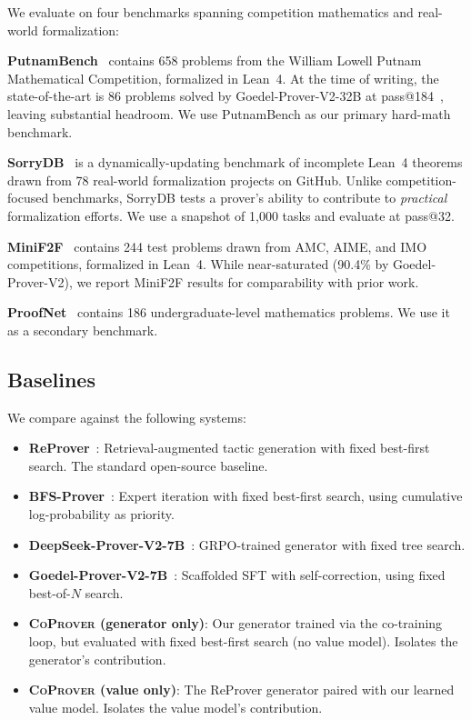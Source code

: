 \documentclass{article}
\newcommand{\coprover}{\textsc{CoProver}}
\begin{document}
We evaluate on four benchmarks spanning competition mathematics and real-world formalization:

\textbf{PutnamBench}~\citep{tsoukalas2024putnambench} contains 658 problems from the William Lowell Putnam Mathematical Competition, formalized in Lean~4. At the time of writing, the state-of-the-art is 86 problems solved by Goedel-Prover-V2-32B at pass@184~\citep{lin2025goedelv2}, leaving substantial headroom. We use PutnamBench as our primary hard-math benchmark.

\textbf{SorryDB}~\citep{letson2026sorrydb} is a dynamically-updating benchmark of incomplete Lean~4 theorems drawn from 78 real-world formalization projects on GitHub. Unlike competition-focused benchmarks, SorryDB tests a prover's ability to contribute to \emph{practical} formalization efforts. We use a snapshot of 1,000 tasks and evaluate at pass@32.

\textbf{MiniF2F}~\citep{zheng2022minif2f} contains 244 test problems drawn from AMC, AIME, and IMO competitions, formalized in Lean~4. While near-saturated (90.4\% by Goedel-Prover-V2), we report MiniF2F results for comparability with prior work.

\textbf{ProofNet}~\citep{azerbayev2023proofnet} contains 186 undergraduate-level mathematics problems. We use it as a secondary benchmark.

\subsection{Baselines}

We compare against the following systems:

\begin{itemize}
    \item \textbf{ReProver}~\citep{yang2023leandojo}: Retrieval-augmented tactic generation with fixed best-first search. The standard open-source baseline.
    \item \textbf{BFS-Prover}~\citep{xin2025bfsprover}: Expert iteration with fixed best-first search, using cumulative log-probability as priority.
    \item \textbf{DeepSeek-Prover-V2-7B}~\citep{ren2025deepseekv2}: GRPO-trained generator with fixed tree search.
    \item \textbf{Goedel-Prover-V2-7B}~\citep{lin2025goedelv2}: Scaffolded SFT with self-correction, using fixed best-of-$N$ search.
    \item \textbf{\coprover{} (generator only)}: Our generator trained via the co-training loop, but evaluated with fixed best-first search (no value model). Isolates the generator's contribution.
    \item \textbf{\coprover{} (value only)}: The ReProver generator paired with our learned value model. Isolates the value model's contribution.
\end{itemize}
\end{document}
